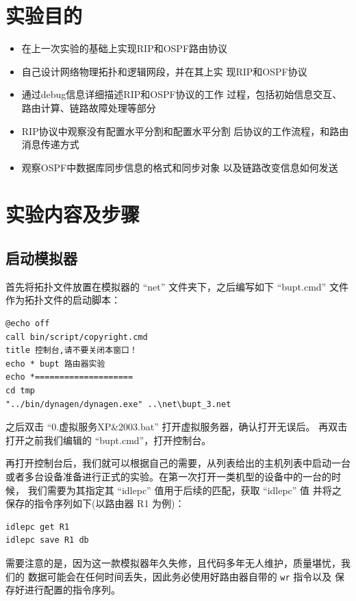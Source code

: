 \documentclass[black,normal,cn]{elegantnote}
\begin{document}
\section{实验目的}

\begin{itemize}
    \item 在上一次实验的基础上实现RIP和OSPF路由协议
    \item 自己设计网络物理拓扑和逻辑网段，并在其上实
    现RIP和OSPF协议
    \item 通过debug信息详细描述RIP和OSPF协议的工作
    过程，包括初始信息交互、路由计算、链路故障处理等部分
    \item RIP协议中观察没有配置水平分割和配置水平分割
    后协议的工作流程，和路由消息传递方式
    \item 观察OSPF中数据库同步信息的格式和同步对象
    以及链路改变信息如何发送
\end{itemize}

\section{实验内容及步骤}

\subsection{启动模拟器}\label{start_emu}
首先将拓扑文件放置在模拟器的 ``net'' 文件夹下，之后编写如下 ``bupt.cmd''
文件作为拓扑文件的启动脚本：

\begin{lstlisting}
@echo off
call bin/script/copyright.cmd
title 控制台,请不要关闭本窗口！
echo * bupt 路由器实验     
echo *====================
cd tmp
"../bin/dynagen/dynagen.exe" ..\net\bupt_3.net
\end{lstlisting}

之后双击 ``0.虚拟服务XP\&2003.bat'' 打开虚拟服务器，确认打开无误后。
再双击打开之前我们编辑的 ``bupt.cmd''，打开控制台。

再打开控制台后，我们就可以根据自己的需要，从列表给出的主机列表中启动一台
或者多台设备准备进行正式的实验。在第一次打开一类机型的设备中的一台的时候，
我们需要为其指定其 ``idlepc'' 值用于后续的匹配，获取 ``idlepc'' 值
并将之保存的指令序列如下(以路由器 R1 为例)：

\begin{lstlisting}
idlepc get R1
idlepc save R1 db
\end{lstlisting}

需要注意的是，因为这一款模拟器年久失修，且代码多年无人维护，质量堪忧，我们的
数据可能会在任何时间丢失，因此务必使用好路由器自带的 \texttt{wr} 指令以及
保存好进行配置的指令序列。
\end{document}
